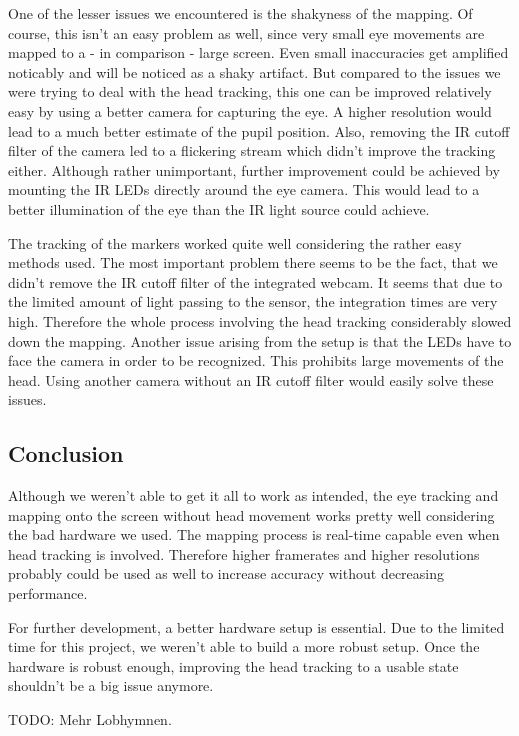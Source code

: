 One of the lesser issues we encountered is the shakyness of the mapping. 
Of course, this isn't an easy problem as well, since very small eye movements are mapped to a - in comparison - large screen. 
Even small inaccuracies get amplified noticably and will be noticed as a shaky artifact.
But compared to the issues we were trying to deal with the head tracking, this one can be improved relatively easy by using a better camera for capturing the eye. 
A higher resolution would lead to a much better estimate of the pupil position. 
Also, removing the IR cutoff filter of the camera led to a flickering stream which didn't improve the tracking either. 
Although rather unimportant, further improvement could be achieved by mounting the IR LEDs directly around the eye camera. This would lead to a better illumination of the eye than the IR light source could achieve. 

The tracking of the markers worked quite well considering the rather easy methods used. 
The most important problem there seems to be the fact, that we didn't remove the IR cutoff filter of the integrated webcam. 
It seems that due to the limited amount of light passing to the sensor, the integration times are very high. 
Therefore the whole process involving the head tracking considerably slowed down the mapping. Another issue arising from the setup is that the LEDs have to face the camera in order to be recognized. This prohibits large movements of the head. Using another camera without an IR cutoff filter would easily solve these issues.

\subsection{Conclusion}
Although we weren't able to get it all to work as intended, the eye tracking and mapping onto the screen without head movement works pretty well considering the bad hardware we used. 
The mapping process is real-time capable even when head tracking is involved. 
Therefore higher framerates and higher resolutions probably could be used as well to increase accuracy without decreasing performance. 

For further development, a better hardware setup is essential. Due to the limited time for this project, we weren't able to build a more robust setup. 
Once the hardware is robust enough, improving the head tracking to a usable state shouldn't be a big issue anymore.

TODO: Mehr Lobhymnen.

